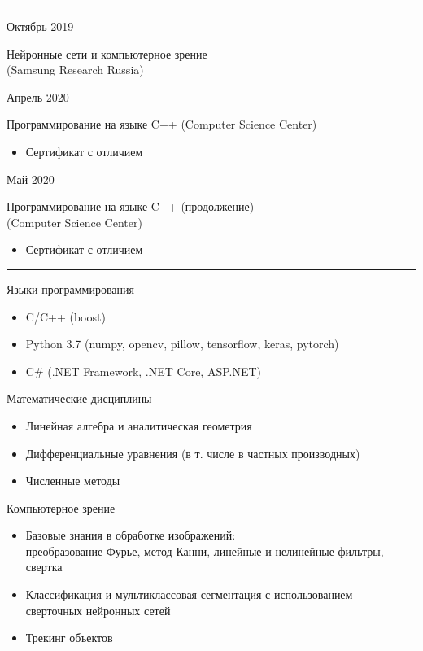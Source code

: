 \documentclass[a4paper,10pt]{article}
\newlength{\cvcolumngapwidth}
\newlength{\cvleftcolumnwidth}
\newlength{\cvrightcolumnwidth}
\newcommand{\cvsectionstyle}[1]{{\normalsize\cvsectionfont\textcolor{cvsectioncolor}{#1}}}
\newcommand{\cvtitlestyle}[1]{{\large\cvtitlefont\textcolor{cvtitlecolor}{#1}}}
\newcommand{\cvdurationstyle}[1]{{\small\cvdurationfont\textcolor{cvdurationcolor}{#1}}}
\newcommand{\cvheadingstyle}[1]{{\normalsize\cvheadingfont\textcolor{cvheadingcolor}{#1}}}
\newlength{\cvafteritemskipamount}
\newlength{\cvaftersectionskipamount}
\newlength{\cvbetweensectionandheadingextraskipamount}
\newlength{\cvaftertitleskipamount}
\newlength{\cvparskip}
\newcommand{\cvsection}[1]{
    \begin{minipage}[t]{\cvleftcolumnwidth}
        \raggedleft\cvsectionstyle{#1}
    \end{minipage}%
    \hspace{\cvcolumngapwidth}%
    \begin{minipage}[t]{\cvrightcolumnwidth}
        \textcolor{cvrulecolor}{\rule{\cvrightcolumnwidth}{0.3mm}}
    \end{minipage}

    \vspace{\cvaftersectionskipamount}
}
\newcommand{\cvitem}[2]{
    \begin{minipage}[t]{\cvleftcolumnwidth}
        \raggedleft #1
    \end{minipage}%
    \hspace{\cvcolumngapwidth}%
    \begin{minipage}[t]{\cvrightcolumnwidth}
        \setlength{\parskip}{\cvparskip} #2
    \end{minipage}

    \vspace{\cvafteritemskipamount}
}
\newcommand{\cvtitle}[1]{
    \cvtitlestyle{#1}

    \vspace{\cvaftertitleskipamount}
    \vspace{-\cvparskip}
}
\begin{document}

\cvsection{Сертификаты}

\cvitem{
    \cvdurationstyle{Октябрь 2019}
}{
    \cvtitle{Нейронные сети и компьютерное зрение\\ (Samsung Research Russia)}

}
\cvitem{
    \cvdurationstyle{Апрель 2020}
}{
    \cvtitle{Программирование на языке C++ (Computer Science Center)}

    \begin{itemize}[leftmargin=*]
        \item Сертификат с отличием
    \end{itemize}
}
\cvitem{
    \cvdurationstyle{Май 2020}
}{
    \cvtitle{Программирование на языке C++ (продолжение)\\ (Computer Science Center)}

    \begin{itemize}[leftmargin=*]
        \item Сертификат с отличием
    \end{itemize}
}




\cvsection{Технические навыки}

\vspace{\cvbetweensectionandheadingextraskipamount}

\cvitem{
    \cvheadingstyle{Языки программирования}
}{
    
    \begin{itemize}
    \item C/C++ (boost)
    \item Python 3.7 (numpy, opencv, pillow, tensorflow, keras, pytorch)
    \item C\# (.NET Framework, .NET Core, ASP.NET)
    \end{itemize}

    
}

\cvitem{
    \cvheadingstyle{Математические дисциплины}
}{
    \begin{itemize}
        \item Линейная алгебра и аналитическая геометрия
        \item Дифференциальные уравнения (в т. числе в частных производных)
        \item Численные методы
    \end{itemize}
}

\cvitem{
    \cvheadingstyle{Компьютерное зрение}
}{
    \begin{itemize}
    \item Базовые знания в обработке изображений: \\
    преобразование Фурье, метод Канни, линейные и нелинейные фильтры, свертка
    \item Классификация и мультиклассовая сегментация с использованием \\ сверточных нейронных сетей
    \item Трекинг объектов
    \end{itemize}
}
\end{document}
